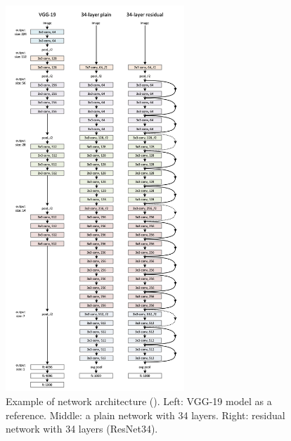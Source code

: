 \begin{figure}[h!]
	\centering
	\includegraphics[width=0.6\textwidth]{../img/resnet.png}
	\caption{Example of network architecture (\cite{He2016}). Left: VGG-19 model as a reference. Middle: a plain network with 34 layers. Right: residual network with 34 layers (ResNet34).}
	\label{fig:resnet}
\end{figure}